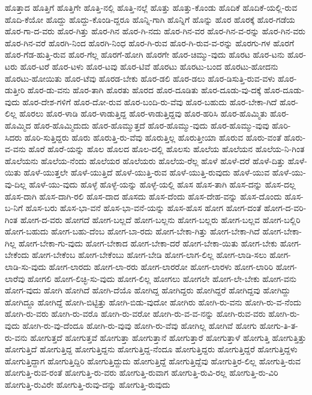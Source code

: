 {ಹೊತ್ತಾದ
ಹೊತ್ತಿಗೆ
ಹೊತ್ತಿಗೇ
ಹೊತ್ತಿ-ನಲ್ಲಿ
ಹೊತ್ತಿ-ನಲ್ಲೆ
ಹೊತ್ತು
ಹೊತ್ತು-ಕೊಂಡು
ಹೊದಿಕೆ
ಹೊದಿಕೆ-ಯಲ್ಲಿ-ರುವ
ಹೊದಿ-ಕೆಯೋ
ಹೊದ್ದು
ಹೊದ್ದು-ಕೊಂಡಿ-ದ್ದರೂ
ಹೊನ್ನಿ-ಗಾಗಿ
ಹೊನ್ನಿಗೆ
ಹೊನ್ನು
ಹೊರ
ಹೊರಕ್ಕೆ
ಹೊರ-ಗಡೆಯ
ಹೊರ-ಗಾ-ದ-ವರು
ಹೊರ-ಗಿತ್ತು
ಹೊರ-ಗಿನ
ಹೊರ-ಗಿ-ನದು
ಹೊರ-ಗಿನ-ವರ
ಹೊರ-ಗಿನ-ವ-ರನ್ನು
ಹೊರ-ಗಿನ-ವರು
ಹೊರ-ಗಿನ-ವರೆ
ಹೊರಗಿ-ನಿಂದ
ಹೊರಗಿ-ನಿಂಧ
ಹೊರ-ಗಿ-ರುವ
ಹೊರ-ಗಿ-ರುವ-ವ-ರನ್ನು
ಹೊರಗು-ಗಳ
ಹೊರಗೆ
ಹೊರ-ಗೆಡ-ಹುತ್ತಿ-ರುವ
ಹೊರ-ಗೆಲ್ಲ
ಹೊರಗೆ-ಹೋಗಿ
ಹೊರಗೇ
ಹೊರ-ಚಿಮ್ಮು-ವುದು
ಹೊರಟ
ಹೊರ-ಟನು
ಹೊರ-ಟರು
ಹೊರ-ಟರೆ
ಹೊರ-ಟಳು
ಹೊರ-ಟವು
ಹೊರ-ಟಿವೆ
ಹೊರಟು
ಹೊರಟು-ಬಂದ
ಹೊರಟು-ಹೋದನು
ಹೊರಟು-ಹೋಯಿತು
ಹೊರ-ಟೆವು
ಹೊರಡ-ಬೇಕು
ಹೊರ-ಡಲಿ
ಹೊರ-ಡಲು
ಹೊರ-ಡಿಸುತ್ತಿ-ರುವ-ವಳು
ಹೊರ-ಡುತ್ತೀರಿ
ಹೊರ-ಡು-ವನು
ಹೊರ-ತಾಗಿ
ಹೊರತು
ಹೊರದ
ಹೊರ-ದೂಡಿತು
ಹೊರ-ದೂಡು-ವು-ದಕ್ಕೆ
ಹೊರ-ದೂಡು-ವುದು
ಹೊರ-ದೇಶ-ಗಳಿಗೆ
ಹೊರ-ದೋ-ರುವ
ಹೊರ-ಬಂದಿ-ರು-ವೆವು
ಹೊರ-ಬಹುದು
ಹೊರ-ಬೇಕಾ-ಗಿದೆ
ಹೊರ-ಲಿಲ್ಲ
ಹೊರಲು
ಹೊರ-ಳಾಡಿ
ಹೊರ-ಳಾಡುತ್ತಿದ್ದ
ಹೊರ-ಳಾಡುತ್ತಿದ್ದವು
ಹೊರ-ಹರಿಸಿ
ಹೊರ-ಹೊಮ್ಮಿತು
ಹೊರ-ಹೊಮ್ಮಿದ
ಹೊರ-ಹೊಮ್ಮಿದುದು
ಹೊರ-ಹೊಮ್ಮುತ್ತದೆ
ಹೊರ-ಹೊಮ್ಮು-ವುದು
ಹೊರ-ಹೊಮ್ಮು-ವುವು
ಹೊರಿ-ಸಿದರು
ಹೊರಿ-ಸುತ್ತಿದ್ದರು
ಹೊರು
ಹೊರುತ್ತಿ-ರು-ವೆವು
ಹೊರುತ್ತಿಲ್ಲ
ಹೊರುತ್ತೀಯಾ
ಹೊರುವ
ಹೊರು-ವಂತೆ
ಹೊರು-ವ-ವನು
ಹೊರೆ
ಹೊರೆ-ಯನ್ನು
ಹೊಲ
ಹೊಲದ
ಹೊಲ-ದಲ್ಲಿ
ಹೊಲಸು
ಹೊಲೆಯ
ಹೊಲೆಯನ
ಹೊಲೆಯ-ನಿ-ಗಿಂತ
ಹೊಲೆಯನು
ಹೊಲೆಯ-ನೆಂದು
ಹೊಲೆಯರ
ಹೊಲೆಯರು
ಹೊಲೆಯ-ರೆಲ್ಲ
ಹೊಳೆ
ಹೊಳೆ-ದರೆ
ಹೊಳೆ-ದಿತ್ತು
ಹೊಳೆ-ಯಿತು
ಹೊಳೆ-ಯುತ್ತಲೇ
ಹೊಳೆ-ಯುತ್ತಿದೆ
ಹೊಳೆ-ಯುತ್ತಿ-ರುವ
ಹೊಳೆ-ಯುತ್ತಿ-ರುವುದು
ಹೊಳೆ-ಯುವ
ಹೊಳೆ-ಯು-ವು-ದಿಲ್ಲ
ಹೊಳೆ-ಯು-ವುದು
ಹೊಳ್ಳೆ
ಹೊಳ್ಳೆ-ಯನ್ನು
ಹೊಳ್ಳೆ-ಯಲ್ಲಿ
ಹೊಸ
ಹೊಸ-ತಾಗಿ
ಹೊಸ-ದನ್ನು
ಹೊಸ-ದಲ್ಲ
ಹೊಸ-ದಾಗಿ
ಹೊಸ-ದಾಗಿ-ರಲಿ
ಹೊಸ-ದಾದ
ಹೊಸದು
ಹೊಸ-ದೆಂದು
ಹೊಸ-ದೇಹ-ವನ್ನು
ಹೊಸ-ದೊಂದು
ಹೊಸ-ಬ-ನಿಗೆ
ಹೊಸ-ಬರು
ಹೊಸ-ಭಾ-ವನೆ
ಹೊಸ-ಭಾ-ವನೆ-ಯನ್ನು
ಹೊಸ-ಹೊಸ
ಹೋಗ
ಹೋಗ-ದಂತೆ
ಹೋಗ-ದ-ವರಿ-ಗಿಂತ
ಹೋಗ-ದ-ವರು
ಹೋಗದೆ
ಹೋಗ-ಬಲ್ಲದೆ
ಹೋಗ-ಬಲ್ಲನು
ಹೋಗ-ಬಲ್ಲರು
ಹೋಗ-ಬಲ್ಲವ
ಹೋಗ-ಬಲ್ಲಿರಿ
ಹೋಗ-ಬಹುದು
ಹೋಗ-ಬಹು-ದೆಂಬ
ಹೋಗ-ಬಾ-ರದು
ಹೋಗ-ಬೇಕಾ-ಗಿತ್ತು
ಹೋಗ-ಬೇಕಾ-ಗಿದೆ
ಹೋಗ-ಬೇಕಾ-ಗಿಲ್ಲ
ಹೋಗ-ಬೇಕಾ-ಗು-ವುದು
ಹೋಗ-ಬೇಕಾದ
ಹೋಗ-ಬೇಕಾ-ದರೆ
ಹೋಗ-ಬೇಕಾ-ಯಿತು
ಹೋಗ-ಬೇಕು
ಹೋಗ-ಬೇಕೆಂದು
ಹೋಗ-ಬೇಕೆಂಬ
ಹೋಗ-ಬೇಕೆಂಬು
ಹೋಗ-ಬೇಡಿ
ಹೋಗ-ಲಾಗ-ಲಿಲ್ಲ
ಹೋಗ-ಲಾಡಿ-ಸಲು
ಹೋಗ-ಲಾಡಿ-ಸು-ವುದು
ಹೋಗ-ಲಾರದು
ಹೋಗ-ಲಾ-ರರು
ಹೋಗ-ಲಾರರೋ
ಹೋಗ-ಲಾರಳು
ಹೋಗ-ಲಾರಿರಿ
ಹೋಗ-ಲಾರೆವು
ಹೋಗಲಿ
ಹೋಗ-ಲಿಚ್ಛಿ-ಸು-ವುದು
ಹೋಗ-ಲಿಲ್ಲ
ಹೋಗಲು
ಹೋಗಲೇ
ಹೋಗ-ಲೇ-ಬೇಕು
ಹೋಗ-ವನು
ಹೋಗ-ವುದು
ಹೋಗಿ
ಹೋಗಿದೆ
ಹೋಗಿ-ದೆಯೊ
ಹೋಗಿದ್ದ
ಹೋಗಿದ್ದರು
ಹೋಗಿದ್ದರೆ
ಹೋಗಿದ್ದವು
ಹೋಗಿದ್ದು
ಹೋಗಿದ್ದೂ
ಹೋಗಿದ್ದೆ
ಹೋಗಿ-ಬಿಟ್ಟಿತ್ತು
ಹೋಗಿ-ಬಿಡು-ವುದೋ
ಹೋಗಿರು
ಹೋಗಿ-ರು-ವನು
ಹೋಗಿ-ರು-ವ-ನೆಂದು
ಹೋಗಿ-ರು-ವರು
ಹೋಗಿ-ರು-ವರೊ
ಹೋಗಿ-ರು-ವರೋ
ಹೋಗಿ-ರು-ವ-ವ-ನನ್ನು
ಹೋಗಿ-ರುವ-ವರು
ಹೋಗಿ-ರು-ವುದು
ಹೋಗಿ-ರು-ವು-ದೆಂದೂ
ಹೋಗಿ-ರು-ವುವು
ಹೋಗಿ-ರು-ವೆವು
ಹೋಗಿಲ್ಲ
ಹೋಗಿವೆ
ಹೋಗು
ಹೋಗು-ತಿ-ತ-ರು-ವನು
ಹೋಗುತ್ತದೆ
ಹೋಗುತ್ತವೆ
ಹೋಗುತ್ತಾ
ಹೋಗುತ್ತಾನೆ
ಹೋಗುತ್ತಾರೆ
ಹೋಗುತ್ತಾಳೆ
ಹೋಗುತ್ತಿ
ಹೋಗುತ್ತಿತ್ತು
ಹೋಗುತ್ತಿದೆ
ಹೋಗುತ್ತಿದ್ದ
ಹೋಗುತ್ತಿದ್ದನು
ಹೋಗುತ್ತಿದ್ದ-ನೆಂದೂ
ಹೋಗುತ್ತಿದ್ದರು
ಹೋಗುತ್ತಿದ್ದರೆ
ಹೋಗುತ್ತಿದ್ದಳು
ಹೋಗುತ್ತಿದ್ದಾಗ
ಹೋಗುತ್ತಿದ್ದಿರಿ
ಹೋಗುತ್ತಿದ್ದುದು
ಹೋಗುತ್ತಿದ್ದೆ
ಹೋಗುತ್ತಿದ್ದೆವು
ಹೋಗುತ್ತಿರ-ಲಿಲ್ಲ
ಹೋಗುತ್ತಿ-ರುವ
ಹೋಗುತ್ತಿ-ರುವ-ರಂತೆ
ಹೋಗುತ್ತಿ-ರು-ವರು
ಹೋಗುತ್ತಿ-ರುವಾಗ
ಹೋಗುತ್ತಿ-ರುವಿ-ರಲ್ಲ
ಹೋಗುತ್ತಿ-ರು-ವಿರಿ
ಹೋಗುತ್ತಿ-ರುವಿರೇ
ಹೋಗುತ್ತಿ-ರುವು-ದನ್ನು
ಹೋಗುತ್ತಿ-ರುವುದು
}
